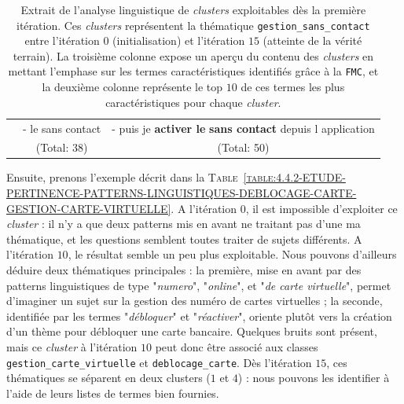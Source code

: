 \begin{table}[!htb]
\begin{center}
\begin{tabular}{|c|l|l|}
						& { \scriptsize - le sans contact }
						& { \scriptsize - puis je \textbf{activer le} \textbf{sans contact} depuis l application }
						\tabularnewline
						
						& \multicolumn{1}{c|}{
							\scriptsize (Total: 38)
						}
						& \multicolumn{1}{c|}{
							\scriptsize (Total: 50)
						}
						\tabularnewline
						\hline
					
				\end{tabular}
				\end{center}
				\caption{
					Extrait de l'analyse linguistique de \textit{clusters} exploitables dès la première itération.
					Ces \textit{clusters} représentent la thématique \texttt{gestion\_sans\_contact} entre l'itération $0$ (initialisation) et l'itération $15$ (atteinte de la vérité terrain).
					La troisième colonne expose un aperçu du contenu des \textit{clusters} en mettant l'emphase sur les termes caractéristiques identifiés grâce à la \texttt{FMC}, et la deuxième colonne représente le top $10$ de ces termes les plus caractéristiques pour chaque \textit{cluster}.
				}
				\label{table:4.4.2-ETUDE-PERTINENCE-PATTERNS-LINGUISTIQUES-GESTION-SANS-CONTACT}
			\end{table}
			
			Ensuite, prenons l'exemple décrit dans la \textsc{Table~\ref{table:4.4.2-ETUDE-PERTINENCE-PATTERNS-LINGUISTIQUES-DEBLOCAGE-CARTE-GESTION-CARTE-VIRTUELLE}}.
			A l'itération $0$, il est impossible d'exploiter ce \textit{cluster} : il n'y a que deux patterns mis en avant ne traitant pas d'une ma thématique, et les questions semblent toutes traiter de sujets différents.
			A l'itération $10$, le résultat semble un peu plus exploitable.
			Nous pouvons d'ailleurs déduire deux thématiques principales : la première, mise en avant par des patterns linguistiques de type "\textit{numero}", "\textit{online}", et "\textit{de carte virtuelle}", permet d'imaginer un sujet sur la gestion des numéro de cartes virtuelles ; la seconde, identifiée par les termes "\textit{débloquer}" et "\textit{réactiver}", oriente plutôt vers la création d'un thème pour débloquer une carte bancaire.
			Quelques bruits sont présent, mais ce \textit{cluster} à l'itération $10$ peut donc être associé aux classes \texttt{gestion\_carte\_virtuelle} et \texttt{deblocage\_carte}.
			Dès l'itération $15$, ces thématiques se séparent en deux clusters ($1$ et $4$) : nous pouvons les identifier à l'aide de leurs listes de termes bien fournies.
			

